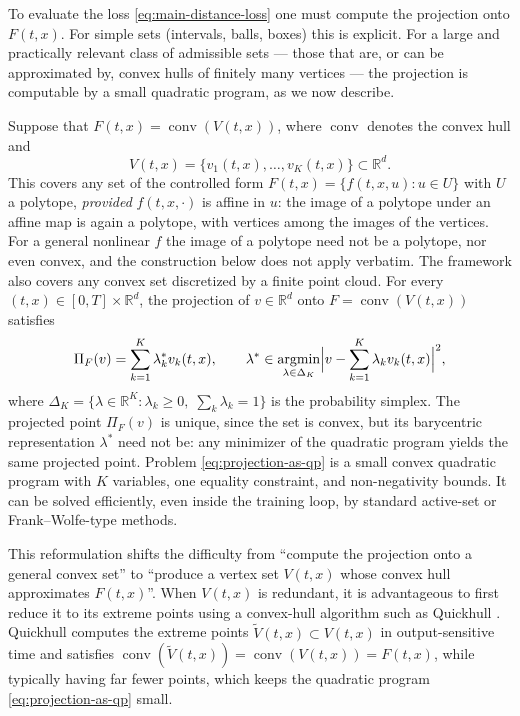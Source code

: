 \documentclass[11pt]{elsarticle}
\theoremstyle{definition}
\theoremstyle{remark}
\numberwithin{equation}{section}
\begin{document}
	To evaluate the loss \eqref{eq:main-distance-loss} one must compute
	the projection onto $F(t,x)$.  For simple sets
	(intervals, balls, boxes) this is explicit.  For a large and practically
	relevant class of admissible sets --- those that are, or can be
	approximated by, convex hulls of finitely many vertices --- the
	projection is computable by a small quadratic program, as we now
	describe.
	
	Suppose that $F(t,x)=\operatorname{conv}(V(t,x))$, where $\operatorname{conv}$ denotes the convex hull and
	\[
	V(t,x)=\{v_1(t,x),\dots,v_K(t,x)\}\subset\mathbb{R}^d.
	\]
	This covers
	any set of the controlled form $F(t,x)=\{f(t,x,u):u\in U\}$ with $U$ a
	polytope, \emph{provided} $f(t,x,\cdot)$ is affine in $u$: the image of
	a polytope under an affine map is again a polytope, with vertices among
	the images of the vertices. For a general nonlinear $f$ the image of a
	polytope need not be a polytope, nor even convex, and the construction
	below does not apply verbatim. The framework also covers
	any convex set discretized by a finite point cloud.  
	For every $(t,x)\in[0,T]\times\mathbb{R}^d$, the projection of
	$v\in\mathbb{R}^d$ onto
	$F=\operatorname{conv}(V(t,x))$ satisfies
	\begin{equation}\label{eq:projection-as-qp}
		\Pi_F(v)
		=
		\sum_{k=1}^K\lambda_k^\ast v_k(t,x),
		\qquad
		\lambda^\ast
		\in
		\operatorname*{argmin}_{\lambda\in\Delta_K}
		\Bigl|v-\sum_{k=1}^K\lambda_k v_k(t,x)\Bigr|^2,
	\end{equation}
	where $\Delta_K=\{\lambda\in\mathbb{R}^K:\lambda_k\ge0,\;\sum_k\lambda_k=1\}$
	is the probability simplex.  The projected point $\Pi_F(v)$ is unique,
	since the set is convex, but its barycentric representation
	$\lambda^\ast$ need not be: any minimizer of the quadratic program
	yields the same projected point.  Problem \eqref{eq:projection-as-qp} is a
	small convex quadratic program with $K$ variables, one equality
	constraint, and non-negativity bounds.  It can be solved efficiently, even
	inside the training loop, by standard active-set or Frank--Wolfe-type
	methods.
	
	This reformulation shifts the difficulty from ``compute the projection
	onto a general convex set'' to ``produce a vertex set $V(t,x)$ whose
	convex hull approximates $F(t,x)$''.  When $V(t,x)$ is
	redundant, it is advantageous to first reduce it to its extreme points
	using a convex-hull algorithm such as Quickhull \cite{barber1996}.
	Quickhull computes the extreme points $\widetilde{V}(t,x)\subset V(t,x)$
	in output-sensitive time and satisfies
	$\operatorname{conv}(\widetilde{V}(t,x))=\operatorname{conv}(V(t,x))=F(t,x)$,
	while typically having far fewer points, which keeps the quadratic
	program \eqref{eq:projection-as-qp} small.
	
\end{document}
